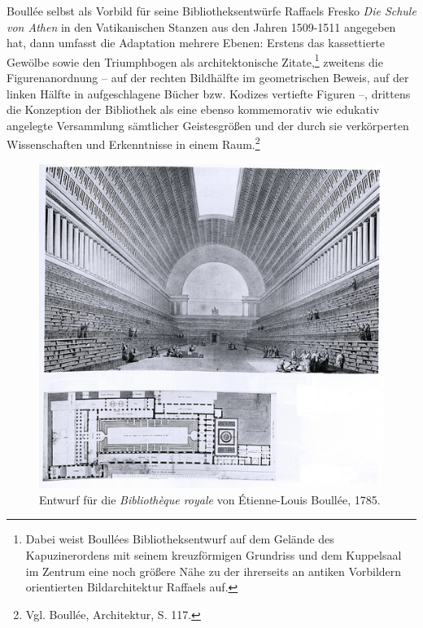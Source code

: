 Boullée selbst als Vorbild für seine Bibliotheksentwürfe Raffaels Fresko
\emph{Die Schule von Athen} in den Vatikanischen Stanzen aus den Jahren
1509-1511 angegeben hat, dann umfasst die Adaptation mehrere Ebenen:
Erstens das kassettierte Gewölbe sowie den Triumphbogen als
architektonische Zitate,\footnote{Dabei weist Boullées
  Bibliotheksentwurf auf dem Gelände des Kapuzinerordens mit seinem
  kreuzförmigen Grundriss und dem Kuppelsaal im Zentrum eine noch
  größere Nähe zu der ihrerseits an antiken Vorbildern orientierten
  Bildarchitektur Raffaels auf.} zweitens die Figurenanordnung -- auf
der rechten Bildhälfte im geometrischen Beweis, auf der linken Hälfte in
aufgeschlagene Bücher bzw. Kodizes vertiefte Figuren --, drittens die
Konzeption der Bibliothek als eine ebenso kommemorativ wie edukativ
angelegte Versammlung sämtlicher Geistesgrößen und der durch sie
verkörperten Wissenschaften und Erkenntnisse in einem Raum.\footnote{Vgl.
  Boullée, Architektur, S. 117.}

\begin{figure}[htbp]
\centering
\includegraphics{img/wagner-5.jpg}
\caption{Entwurf für die \emph{Bibliothèque royale} von
Étienne-Louis Boullée, 1785.}
\end{figure}

